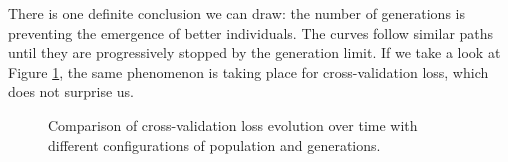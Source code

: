 	There is one definite conclusion we can draw: the number of generations is preventing the emergence of better individuals. The curves follow similar paths until they are progressively stopped by the generation limit. If we take a look at Figure \ref{gfx:fs_popgen_cv}, the same phenomenon is taking place for cross-validation loss, which does not surprise us.

\newpage

	\begin{figure}[bth]

        \begin{center}

        	\setlength{\fboxrule}{0pt}

		\end{center}
		\caption[Cross-validation loss comparison for different populations and generations]{Comparison of cross-validation loss evolution over time with different configurations of population and generations.}\label{gfx:fs_popgen_cv}

	\end{figure}

